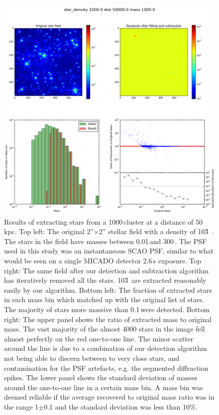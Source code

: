 \begin{appendix}
\begin{figure}
    \centering
    \includegraphics[width=\textwidth]{images/results6_dist=50000_rho=1000}
    \caption{Results of extracting stars from a 1000\,\spa cluster at a distance of 50\,kpc. Top left: The original 2''$\times$2'' stellar field with a density of 10\h3~\spa. The stars in the field have masses between 0.01\,\msun and 300\,\msune. The PSF used in this study was an instantaneous SCAO PSF, similar to what would be seen on a single MICADO detector 2.6\,s exposure. Top right: The same field after our detection and subtraction algorithm has iteratively removed all the stars. 10\h3~\spa are extracted reasonably easily by our algorithm. Bottom left: The fraction of extracted stars in each mass bin which matched up with the original list of stars. The majority of stars more massive than 0.1\,\msun were detected. Bottom right: The upper panel shows the ratio of extracted mass to original mass. The vast majority of the almost 4000 stars in the image fell almost perfectly on the red one-to-one line. The minor scatter around the line is due to a combination of our detection algorithm not being able to discern between to very close stars, and contamination for the PSF artefacts, e.g. the segmented diffraction spikes. The lower panel shows the standard deviation of masses around the one-to-one line in a certain mass bin. A mass bin was deemed reliable if the average recovered to original mass ratio was in the range 1$\pm$0.1 and the standard deviation was less than 10\%.}
    \label{fig:results_lmc_1E3}
\end{figure}



\end{appendix}
